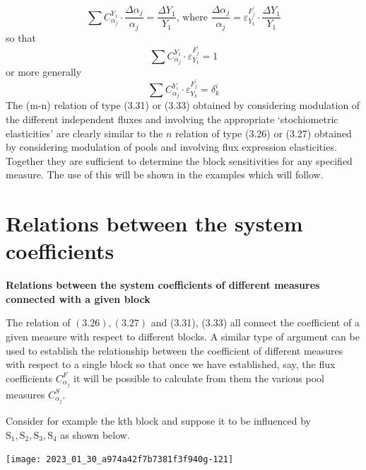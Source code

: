 %
$$
\sum C_{\alpha_{j}}^{Y_{1}} \cdot \frac{\Delta \alpha_{j}}{\alpha_{j}}=\frac{\Delta Y_{1}}{Y_{1}} \text {, where } \frac{\Delta \alpha_{j}}{\alpha_{j}}=\varepsilon_{Y_{1}}^{F_{j}^{\prime}} \cdot \frac{\Delta Y_{1}}{Y_{1}}
$$
%
so that
%
\begin{equation}
\sum C_{\alpha_{j}}^{Y_{1}} \cdot \varepsilon_{Y_{1}}^{F_{j}^{\prime}}=1
\label{eqn:332}
\end{equation}
%
or more generally
%
\begin{equation}
\sum C_{\alpha_{j}}^{Y_{i}} \cdot \varepsilon_{Y_{k}}^{F_{j}^{\prime}}=\delta_{k}^{i}
\label{eqn:333}
\end{equation}
%
The (m-n) relation of type (3.31) or (3.33) obtained by considering modulation of the different independent fluxes and involving the appropriate `stochiometric elasticities' are clearly similar to the $n$ relation of type (3.26) or (3.27) obtained by considering modulation of pools and involving flux expression elasticities. Together they are sufficient to determine the block sensitivities for any specified measure. The use of this will be shown in the examples which will follow.

\section{Relations between the system coefficients}

{\bf Relations between the system coefficients of different measures connected with a given block}

The relation of $(3.26),(3.27)$ and (3.31), (3.33) all connect the coefficient of a given measure with respect to different blocks. A similar type of argument can be used to establish the relationship  between the coefficient of different measures with respect to a single block so that once we have established, say, the flux coefficients $C_{\alpha_{j}}^{F}$ it will be possible to calculate from them the various pool measures $C_{\alpha_{j}}^{S}$.

Consider for example the kth block and suppose it to be influenced by $\mathrm{S}_{1}, \mathrm{S}_{2}, \mathrm{S}_{3}, \mathrm{S}_{4}$ as shown below.

\begin{center}
\texttt{[image: 2023\_01\_30\_a974a42f7b7381f3f940g-121]}
\end{center}

